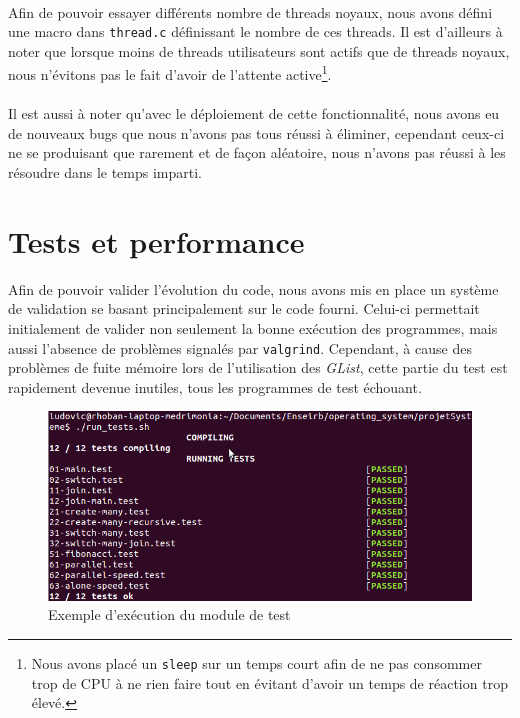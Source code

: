 \documentclass{article}
\begin{document}
        \paragraph{}
        Afin de pouvoir essayer différents nombre de threads noyaux, nous
        avons défini une macro dans \verb!thread.c! définissant le nombre
        de ces threads. Il est d'ailleurs à noter que lorsque moins de
        threads utilisateurs sont actifs que de threads noyaux, nous
        n'évitons pas le fait d'avoir de l'attente active\footnote{Nous avons
          placé un \verb!sleep! sur un temps court afin de ne pas consommer
          trop de CPU à ne rien faire tout en évitant d'avoir un temps de
          réaction trop élevé.}.
        \paragraph{}
        Il est aussi à noter qu'avec le déploiement de cette fonctionnalité,
        nous avons eu de nouveaux bugs que nous n'avons pas tous réussi à
        éliminer, cependant ceux-ci ne se produisant que rarement et de façon
        aléatoire, nous n'avons pas réussi à les résoudre dans le temps
        imparti.

	\section{Tests et performance}
    Afin de pouvoir valider l'évolution du code, nous avons mis en place un
    système de validation se basant principalement sur le code fourni.
    Celui-ci permettait initialement de valider non seulement la bonne
    exécution des programmes, mais aussi l'absence de problèmes signalés par
    \verb!valgrind!. Cependant, à cause des problèmes de fuite mémoire lors
    de l'utilisation des {\em GList}, cette partie du test est rapidement
    devenue inutiles, tous les programmes de test échouant.
    \begin{figure}[H]
      \caption{Exemple d'exécution du module de test}
      \centering
      \includegraphics [width=\textwidth]{tests.png}
    \end{figure}
\end{document}
